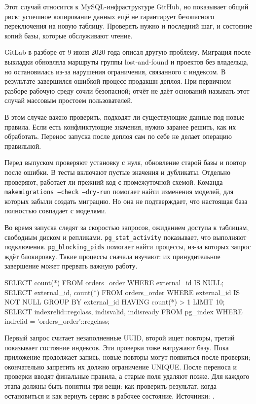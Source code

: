 \documentclass[11pt,a4paper]{article}
\newcommand{\src}[1]{{\small\color{muted}Источники: #1.}}
\begin{document}
Этот случай относится к MySQL-инфраструктуре GitHub, но показывает общий риск: успешное копирование данных ещё не гарантирует безопасного переключения на новую таблицу. Проверять нужно и последний шаг, и состояние копий базы, которые обслуживают чтение.

GitLab в разборе от 9 июня 2020 года описал другую проблему. Миграция после выкладки обновляла маршруты группы lost-and-found и проектов без владельца, но остановилась из-за нарушения ограничения, связанного с индексом. В результате завершился ошибкой процесс продакшн-деплоя. При первичном разборе рабочую среду сочли безопасной; отчёт не даёт оснований называть этот случай массовым простоем пользователей.

В этом случае важно проверить, подходят ли существующие данные под новые правила. Если есть конфликтующие значения, нужно заранее решить, как их обработать. Перенос запуска после деплоя сам по себе не делает операцию правильной.

Перед выпуском проверяют установку с нуля, обновление старой базы и повтор после ошибки. В тесты включают пустые значения и дубликаты. Отдельно проверяют, работает ли прежний код с промежуточной схемой. Команда \texttt{makemigrations --check --dry-run} помогает найти изменения моделей, для которых забыли создать миграцию. Но она не подтверждает, что настоящая база полностью совпадает с моделями.

Во время запуска следят за скоростью запросов, ожиданием доступа к таблицам, свободным диском и репликами. \texttt{pg\_stat\_activity} показывает, что выполняют подключения. \texttt{pg\_blocking\_pids} помогает найти процессы, из-за которых запрос ждёт блокировку. Такие процессы сначала изучают: их принудительное завершение может прервать важную работу.
\begin{code}
SELECT count(*) FROM orders_order WHERE external_id IS NULL;
SELECT external_id, count(*) FROM orders_order
WHERE external_id IS NOT NULL
GROUP BY external_id HAVING count(*) > 1 LIMIT 10;
SELECT indexrelid::regclass, indisvalid, indisready
FROM pg_index WHERE indrelid = 'orders_order'::regclass;
\end{code}
Первый запрос считает незаполненные UUID, второй ищет повторы, третий показывает состояние индексов. Эти проверки тоже нагружают базу. Пока приложение продолжает запись, новые повторы могут появиться после проверки; окончательно запретить их должно ограничение UNIQUE. После переноса и проверки вводят финальные правила, а старые поля удаляют позже. Для каждого этапа должны быть понятны три вещи: как проверить результат, когда остановиться и как вернуть сервис в рабочее состояние.
\src{\cite{githubincident,gitlabincident,admin,pgstats,pgfunctions,pgcatalog}}
\end{document}
